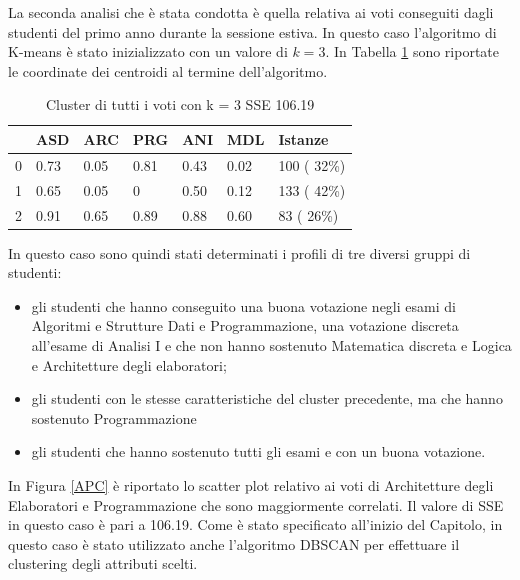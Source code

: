 \documentclass[12pt]{article}
\begin{document}
La seconda analisi che è stata condotta è quella relativa ai voti conseguiti dagli studenti del primo anno durante la sessione estiva. In questo caso l'algoritmo di K-means è stato inizializzato con un valore di $k=3$.
In Tabella \ref{c3V} sono riportate le coordinate dei centroidi al termine dell'algoritmo. 
\begin{table}[ht]
	\centering
	\begin{tabular}{@{}lllllll@{}}
	\toprule
	  & ASD  & ARC  & PRG & ANI  & MDL  & Istanze      \\ \midrule
	0 & 0.73 & 0.05 & 0.81& 0.43 & 0.02 &  100  ( 32\%)\\
	1 & 0.65 & 0.05 & 0   & 0.50 & 0.12 &  133 ( 42\%) \\
	2 & 0.91 & 0.65 & 0.89& 0.88 & 0.60 &  83  ( 26\%) \\ \bottomrule
	\end{tabular}
	\caption{Cluster di tutti i voti con k = 3 SSE 106.19}
	\label{c3V}
\end{table}
In questo caso sono quindi stati determinati i profili di tre diversi gruppi di studenti:
\begin{itemize}
\item gli studenti che hanno conseguito una buona votazione negli esami di Algoritmi e Strutture Dati e Programmazione,
una votazione discreta all'esame di Analisi I e che non hanno sostenuto Matematica discreta e Logica e Architetture degli elaboratori;
\item gli studenti con le stesse caratteristiche del cluster precedente, ma che hanno sostenuto Programmazione
\item gli studenti che hanno sostenuto tutti gli esami e con un buona votazione.
\end{itemize}
In Figura \ref{APC} è riportato lo scatter plot relativo ai voti di Architetture degli Elaboratori e Programmazione che sono
maggiormente correlati. Il valore di SSE in questo caso è pari a 106.19. 
Come è stato specificato all'inizio del Capitolo, in questo caso è stato utilizzato anche l'algoritmo DBSCAN per effettuare il clustering degli attributi scelti. 
\end{document}
